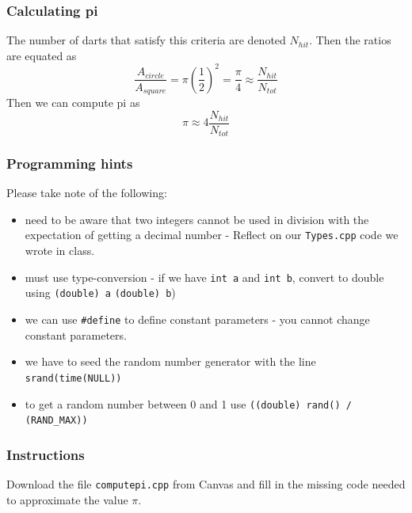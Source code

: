 \documentclass{if-beamer}
\begin{document}
\begin{frame}
\frametitle{Calculating pi}
The number of darts that satisfy this criteria are denoted $N_{hit}$. Then the ratios are equated
as
\begin{equation*}
\frac{A_{circle}}{A_{square}} = \pi (\frac{1}{2})^2 = \frac{\pi}{4} \approx \frac{N_{hit}}{N_{tot}}
\end{equation*}
Then we can compute pi as
\begin{equation*}
\pi \approx 4\frac{N_{hit}}{N_{tot}}
\end{equation*}
\end{frame}

\begin{frame}[shrink=15]
\frametitle{Programming hints}
\vspace{1.5cm}
Please take note of the following: \\\vspace{4.5pt}
\begin{itemize}
\item need to be aware that two integers cannot be used in division
with the expectation of getting a decimal number - Reflect on our \texttt{Types.cpp} code we wrote in class.\\\vspace{4.5pt}
\item must use type-conversion - if we have \texttt{int a} and
\texttt{int b}, convert to double using \texttt{(double) a} 
\texttt{(double) b})\\\vspace{4.5pt}
\item we can use \texttt{\#define} to define constant parameters - you cannot change constant parameters.\\\vspace{4.5pt}
\item we have to seed the random number generator with the line \texttt{srand(time(NULL))}\\\vspace{4.5pt}
\item to get a random number between 0 and 1 use \texttt{((double) rand() / (RAND\_MAX))}
\end{itemize}
\end{frame}

\begin{frame}
\frametitle{Instructions}
Download the file \texttt{computepi.cpp} from Canvas and fill in the
missing code needed to approximate the value $\pi$.
\end{frame}
\end{document}
